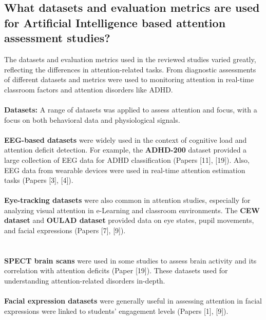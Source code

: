 \documentclass[12pt]{article}
\begin{document}
\subsection{What datasets and evaluation metrics are used for Artificial Intelligence based attention assessment studies?}
The datasets and evaluation metrics used in the reviewed studies varied greatly, reflecting the differences in attention-related tasks. From diagnostic assessments of different datasets and metrics were used to monitoring attention in real-time classroom factors and attention disorders like ADHD. \\ \\
\textbf{Datasets:} A range of datasets was applied to assess attention and focus, with a focus on both behavioral data and physiological signals. \\ \\
\textbullet \textbf{EEG-based datasets} were widely used in the context of cognitive load and attention deficit detection.  For example, the \textbf{ADHD-200} dataset provided a large collection of EEG data for ADHD classification (Papers [11], [19]). Also, EEG data from wearable devices were used in real-time attention estimation tasks (Papers [3], [4]).  \\ \\
\textbullet \textbf{Eye-tracking datasets} were also common in attention studies, especially for analyzing visual attention in e-Learning and classroom environments. The \textbf{CEW dataset} and \textbf{OULAD dataset} provided data on eye states, pupil movements, and facial expressions (Papers [7], [9]).  \\ \\ \\
\textbullet \textbf{SPECT brain scans} were used in some studies to assess brain activity and its correlation with attention deficits (Paper [19]). These datasets used for understanding attention-related disorders in-depth.  \\ \\
\textbullet \textbf{Facial expression datasets} were generally useful in assessing attention in facial expressions were linked to students' engagement levels (Papers [1], [9]).  \\ \\
\end{document}
